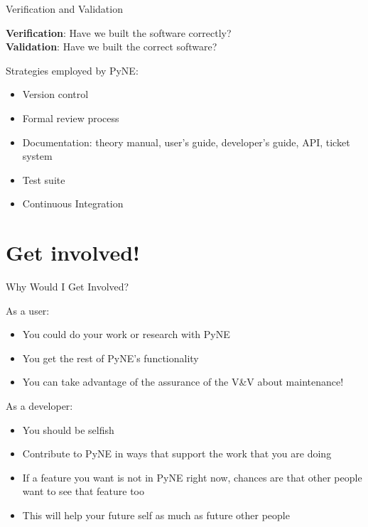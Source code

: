 \documentclass[xcolor=x11names,compress]{beamer}
\renewcommand{\(}{\begin{columns}}
\renewcommand{\)}{\end{columns}}
\newcommand{\<}[1]{\begin{column}{#1}}
\renewcommand{\>}{\end{column}}
\begin{document}
\begin{frame}{Verification and Validation}

    \textbf{Verification}: Have we built the software correctly?\\
    \textbf{Validation}: Have we built the correct software?

    \vspace*{1 em}
    Strategies employed by PyNE:

    \begin{itemize}
      \item Version control
      \item Formal review process
      \item Documentation: theory manual, user's guide, developer's guide, API,
      ticket system
      \item Test suite
      \item Continuous Integration
    \end{itemize}

\end{frame}

\section{Get involved!}
\begin{frame}{Why Would I Get Involved?}

    \begin{block}{As a \alert{user}:}
    \begin{itemize}
      \item You could do your work or research with PyNE
      \item You get the rest of PyNE's functionality
      \item You can take advantage of the assurance of the V\&V 
      about maintenance!
    \end{itemize}
    \end{block}

    \vspace*{1 em}
    \begin{block}{As a \alert{developer}:}
    \begin{itemize}
      \item You should be selfish
      \item Contribute to PyNE in ways that support the work that you are doing
      \item If a feature you want is not in PyNE right now, chances are that other
      people want to see that feature too
      \item This will help your future self as much as future other people
    \end{itemize}
\end{block}

\end{frame}
\end{document}

